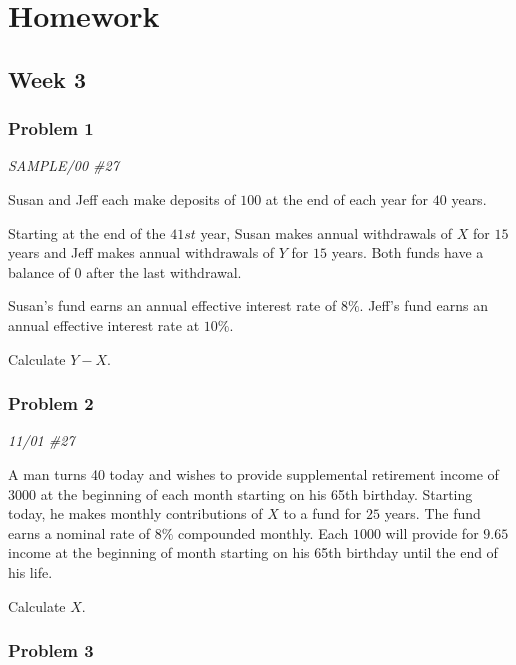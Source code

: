 \documentclass[
]{book}
\begin{document}
\hypertarget{homework}{%
\chapter*{Homework}\label{homework}}

\hypertarget{week-3}{%
\section*{Week 3}\label{week-3}}

\hypertarget{problem-1}{%
\subsection*{Problem 1}\label{problem-1}}

\emph{SAMPLE/00 \#27}

Susan and Jeff each make deposits of \(100\) at the end of each year for \(40\) years.

Starting at the end of the \(41st\) year, Susan makes annual withdrawals of \(X\) for \(15\) years and Jeff makes annual withdrawals of \(Y\) for \(15\) years. Both funds have a balance of \(0\) after the last withdrawal.

Susan's fund earns an annual effective interest rate of \(8\%\). Jeff's fund earns an annual effective interest rate at \(10\%\).

Calculate \(Y-X\).

\hypertarget{problem-2}{%
\subsection*{Problem 2}\label{problem-2}}

\emph{11/01 \#27}

A man turns 40 today and wishes to provide supplemental retirement income of \(3000\) at the beginning of each month starting on his 65th birthday. Starting today, he makes monthly contributions of \(X\) to a fund for \(25\) years. The fund earns a nominal rate of \(8\%\) compounded monthly. Each \(1000\) will provide for \(9.65\) income at the beginning of month starting on his 65th birthday until the end of his life.

Calculate \(X\).

\hypertarget{problem-3}{%
\subsection*{Problem 3}\label{problem-3}}
\end{document}
